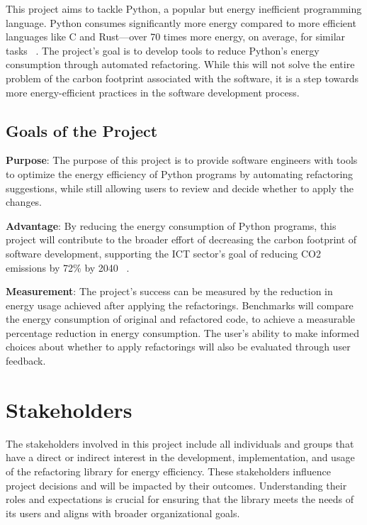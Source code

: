 \documentclass[12pt]{article}
\begin{document}
This project aims to tackle Python, a popular but energy inefficient programming language. Python consumes significantly more energy compared to more efficient languages like C and Rust—over 70 times more energy, on average, for similar tasks ~\citep{PereiraEtAl2017}. The project's goal is to develop tools to reduce Python's energy consumption through automated refactoring. While this will not solve the entire problem of the carbon footprint associated with the software, it is a step towards more energy-efficient practices in the software development process.

\subsection{Goals of the Project}
\noindent \textbf{Purpose}: The purpose of this project is to provide software engineers with tools to optimize the energy efficiency of Python programs by automating refactoring suggestions, while still allowing users to review and decide whether to apply the changes.

\noindent \textbf{Advantage}: By reducing the energy consumption of Python programs, this project will contribute to the broader effort of decreasing the carbon footprint of software development, supporting the ICT sector's goal of reducing CO2 emissions by 72\% by 2040 ~\citep{FreitagAndBernersLee2021}.

\noindent \textbf{Measurement}: The project's success can be measured by the reduction in energy usage 
achieved after applying the refactorings. Benchmarks will compare the energy consumption of original 
and refactored code, to achieve a measurable percentage reduction in energy consumption. The user's 
ability to make informed choices about whether to apply refactorings will also be evaluated through 
user feedback.

\section{Stakeholders}

The stakeholders involved in this project include all individuals and groups that have a direct or indirect interest in the development, implementation, and usage of the refactoring library for energy efficiency. These stakeholders influence project decisions and will be impacted by their outcomes. Understanding their roles and expectations is crucial for ensuring that the library meets the needs of its users and aligns with broader organizational goals.\\
\end{document}
